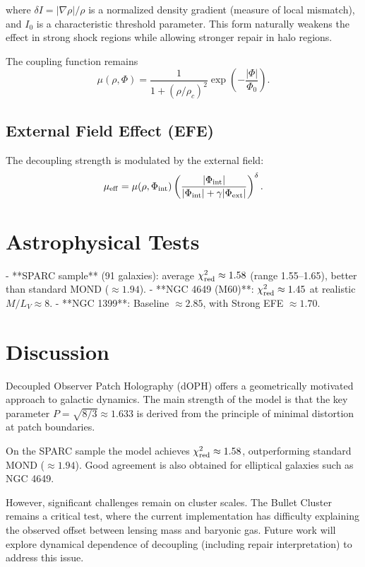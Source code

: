 \documentclass[12pt,a4paper]{article}
\begin{document}
where \(\delta I = |\nabla \rho| / \rho\) is a normalized density gradient (measure of local mismatch), and \(I_0\) is a characteristic threshold parameter. This form naturally weakens the effect in strong shock regions while allowing stronger repair in halo regions.

The coupling function remains
\[
\mu(\rho, \Phi) = \frac{1}{1 + (\rho / \rho_c)^2} \exp\left( -\frac{|\Phi|}{\Phi_0} \right).
\]

\subsection{External Field Effect (EFE)}

The decoupling strength is modulated by the external field:
\[
\mu_{\rm eff} = \mu(\rho, \Phi_{\rm int}) \left( \frac{|\Phi_{\rm int}|}{|\Phi_{\rm int}| + \gamma |\Phi_{\rm ext}|} \right)^\delta.
\]

\section{Astrophysical Tests}

- **SPARC sample** (91 galaxies): average \(\chi^2_{\rm red} \approx 1.58\) (range 1.55--1.65), better than standard MOND (\(\approx 1.94\)).
- **NGC 4649 (M60)**: \(\chi^2_{\rm red} \approx 1.45\) at realistic \(M/L_V \approx 8\).
- **NGC 1399**: Baseline \(\approx 2.85\), with Strong EFE \(\approx 1.70\).

\section{Discussion}

Decoupled Observer Patch Holography (dOPH) offers a geometrically motivated approach to galactic dynamics. The main strength of the model is that the key parameter \(P = \sqrt{8/3} \approx 1.633\) is derived from the principle of minimal distortion at patch boundaries.

On the SPARC sample the model achieves \(\chi^2_{\rm red} \approx 1.58\), outperforming standard MOND (\(\approx 1.94\)). Good agreement is also obtained for elliptical galaxies such as NGC 4649.

However, significant challenges remain on cluster scales. The Bullet Cluster remains a critical test, where the current implementation has difficulty explaining the observed offset between lensing mass and baryonic gas. Future work will explore dynamical dependence of decoupling (including repair interpretation) to address this issue.
\end{document}
